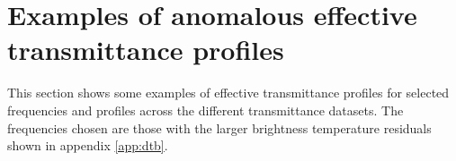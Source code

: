 \section{Examples of anomalous effective transmittance profiles}
This section shows some examples of effective transmittance profiles for selected frequencies and profiles across the different transmittance datasets. The frequencies chosen are those with the larger brightness temperature residuals shown in appendix \ref{app:dtb}.


